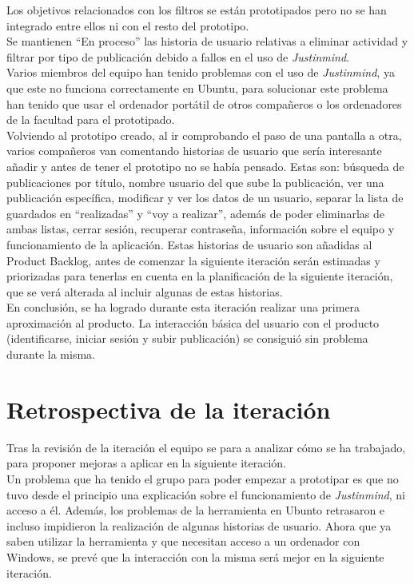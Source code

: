 \documentclass[11pt]{article}
\begin{document}
Los objetivos relacionados con los filtros se están prototipados pero no se han integrado entre ellos ni con el resto del prototipo.\\

Se mantienen ``En proceso'' las historia de usuario relativas a eliminar actividad y filtrar por tipo de publicación debido a fallos en el uso de \textit{Justinmind}.\\

Varios miembros del equipo han tenido problemas con el uso de \textit{Justinmind}, ya que este no funciona correctamente en Ubuntu, para solucionar este problema han tenido que usar el ordenador portátil de otros compañeros o los ordenadores de la facultad para el prototipado.\\

Volviendo al prototipo creado, al ir comprobando el paso de una pantalla a otra, varios compañeros van comentando historias de usuario que sería interesante añadir y antes de tener el prototipo no se había pensado. Estas son: búsqueda de publicaciones por título, nombre usuario del que sube la publicación, ver una publicación específica, modificar y ver los datos de un usuario, separar la lista de guardados en ``realizadas'' y ``voy a realizar'', además de poder eliminarlas de ambas listas, cerrar sesión, recuperar contraseña, información sobre el equipo y funcionamiento de la aplicación. Estas historias de usuario son añadidas al Product Backlog, antes de comenzar la siguiente iteración serán estimadas y priorizadas para tenerlas en cuenta en la planificación de la siguiente iteración, que se verá alterada al incluir algunas de estas historias.\\

En conclusión, se ha logrado durante esta iteración realizar una primera aproximación al producto. La interacción básica del usuario con el producto (identificarse, iniciar sesión y subir publicación) se consiguió sin problema durante la misma.\\

\newpage
\section*{Retrospectiva de la iteración}
Tras la revisión de la iteración el equipo se para a analizar cómo se ha trabajado, para proponer mejoras a aplicar en la siguiente iteración.\\

Un problema que ha tenido el grupo para poder empezar a prototipar es que no tuvo desde el principio una explicación sobre el funcionamiento de \textit{Justinmind}, ni acceso a él. Además, los problemas de la herramienta en Ubunto retrasaron e incluso impidieron la realización de algunas historias de usuario. Ahora que ya saben utilizar la herramienta y que necesitan acceso a un ordenador con Windows, se prevé que la interacción con la misma será mejor en la siguiente iteración.\\
\end{document}
